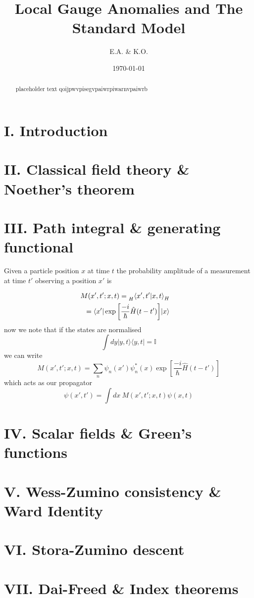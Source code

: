 \documentclass[11pt,aps,prl,lengthcheck]{revtex4-2}
\begin{document}
\title{Local Gauge Anomalies and The Standard Model}
\author{E.A. \& K.O.}
\date{\today}
\begin{abstract}
\noindent
placeholder text qoijpwvpisegvpaiwrpiwarnvpaiwrb
\end{abstract}
\maketitle

\section{I\@. Introduction}
\section{II\@. Classical field theory \& Noether's theorem}
\section{III\@. Path integral \& generating functional}
Given a particle position $x$ at time $t$ the probability amplitude of
a measurement at time $t'$ observing a position $x'$ is

\begin{align*}
  \begin{split}
  M(x', t'; x, t) &= \prescript{}{H}{\braket{x',t'|x, t}_{H}}
  \end{split} \\
  \begin{split}
  &= \braket{x'|\exp{\left[\frac{-i}{\hbar}\hat{H}(t-t')\right]}|x}
  \end{split}
\end{align*}\label{eq:1}
now we note that if the states are normalised
\begin{equation}
  \int{dy |y,t\rangle{} \langle{y,t|} } = \mathbb{I}
\end{equation}
we can write 
  \begin{equation}
    M(x', t'; x, t) = \sum_{n}{\psi_{n}(x')\psi_{n}^*(x)\exp{\left[\frac{-i}{\hbar}\hat{H}(t-t')\right]}}
  \end{equation}
which acts as our propagator
\begin{equation}
 \psi(x', t') = \int{dx \ M(x', t'; x, t) \psi(x, t)}
\end{equation}



\section{IV\@. Scalar fields \& Green's functions}
\section{V\@. Wess-Zumino consistency \& Ward Identity}
\section{VI\@. Stora-Zumino descent}
\section{VII\@. Dai-Freed \& Index theorems}
\end{document}
